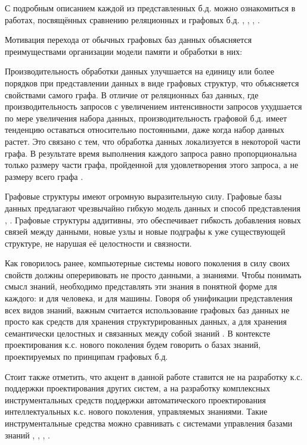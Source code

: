 С подробным описанием каждой из представленных б.д. можно ознакомиться в работах, посвящённых сравнению  реляционных и графовых б.д. , \cite{vicknair2010comparison}, , .

Мотивация перехода от обычных графовых баз данных объясняется преимуществами организации модели памяти и обработки в них:
\begin{textitemize}
    \item Производительность обработки данных улучшается на единицу или более порядков при представлении данных в виде графовых структур, что объясняется свойствами самого графа. В отличие от реляционных баз данных, где производительность запросов с увеличением интенсивности запросов ухудшается по мере увеличения набора данных, производительность графовой б.д. имеет тенденцию оставаться относительно постоянными, даже когда набор данных растет. Это связано с тем, что обработка данных локализуется в некоторой части графа. В результате время выполнения каждого запроса равно пропорциональна только размеру части графа, пройденной для удовлетворения этого запроса, а не размеру всего графа \cite{Khasahmadi2020Memory-Based}.
    \item Графовые структуры имеют огромную выразительную силу. Графовые базы данных предлагают чрезвычайно гибкую модель данных и способ представления \cite{Diskrete_Math}, \cite{Reinhard}. Графовые структуры аддитивны, это обеспечивает гибкость добавления новых связей между данными, новые узлы и новые подграфы к уже существующей структуре, не нарушая её целостности и связности.
\end{textitemize}

Как говорилось ранее, компьютерные системы нового поколения в силу своих свойств должны опереривовать не просто данными, а знаниями. Чтобы понимать смысл знаний, необходимо представлять эти знания в понятной форме для каждого: и для человека, и для машины. Говоря об унификации представления всех видов знаний, важным считается использование графовых баз данных не просто как средств для хранения структурированных данных, а для хранения семантически целостных и связанных между собой знаний \cite{SenKB2017}. В контексте проектирования к.с. нового поколения будем говорить о базах знаний, проектируемых по принципам графовых б.д.

Стоит также отметить, что акцент в данной работе ставится не на разработку к.с. поддержки проектирования других систем, а на разработку комплексных инструментальных средств поддержки автоматического проектирования интеллектуальных к.с. нового поколения, управляемых знаниями. Такие инструментальные средства можно сравнивать с системами управления базами знаний , \cite{Gavrilova2000}, , .


